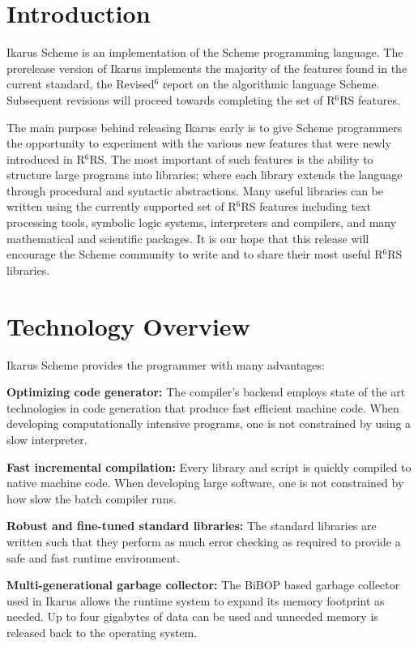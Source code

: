 \documentclass[onecolumn, 12pt, twoside, openright, dvipdfm]{book}
\newcommand{\rnrs}[1]{R$^{\mathrm{#1}}$RS}
\begin{document}
\section{Introduction}

Ikarus Scheme is an implementation of the Scheme programming
language\cite{steele:scheme}.  The prerelease version of Ikarus
implements the majority of the features found in the current
standard, the Revised$^6$ report on the algorithmic language
Scheme\cite{r6rs}.  Subsequent revisions will proceed towards
completing the set of \rnrs{6} features.

The main purpose behind releasing Ikarus early is to give Scheme
programmers the opportunity to experiment with the various new
features that were newly introduced in \rnrs{6}.  The most important
of such features is the ability to structure large programs into
libraries; where each library extends the language through
procedural and syntactic abstractions.  Many useful libraries can be
written using the currently supported set of \rnrs{6} features
including text processing tools, symbolic logic systems,
interpreters and compilers, and many mathematical and scientific
packages.  It is our hope that this release will encourage the
Scheme community to write and to share their most useful \rnrs{6}
libraries.
\newpage

\section{Technology Overview}

Ikarus Scheme provides the programmer with many advantages:

\textbf{Optimizing code generator:}  The compiler's backend employs
state of the art technologies in code generation that produce fast
efficient machine code.  When developing computationally intensive
programs, one is not constrained by using a slow interpreter.

\textbf{Fast incremental compilation:}  Every library and script is
quickly compiled to native machine code.  When developing large
software, one is not constrained by how slow the batch compiler
runs.

\textbf{Robust and fine-tuned standard libraries:}  The standard
libraries are written such that they perform as much error checking
as required to provide a safe and fast runtime environment. 

\textbf{Multi-generational garbage collector:} The
BiBOP\cite{dybvig:sm} based garbage collector used in Ikarus allows
the runtime system to expand its memory footprint as needed.  Up to
four gigabytes of data can be used and unneeded memory is released
back to the operating system.
\end{document}
